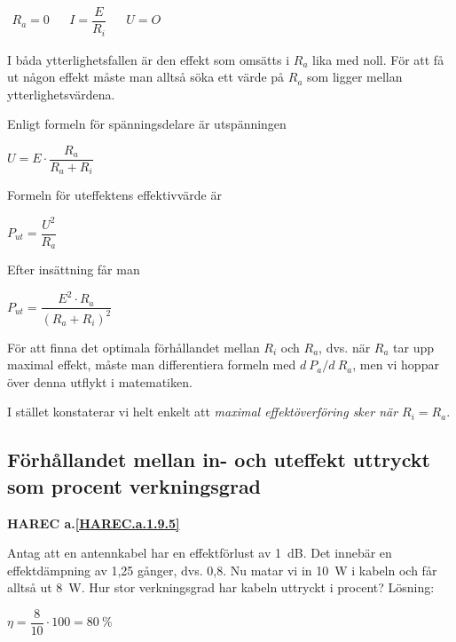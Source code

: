 \(
\begin{array}{lllll}
R_a = 0 & & I = \dfrac{E}{R_i} & & U = O
\end{array}
\)

I båda ytterlighetsfallen är den effekt som omsätts i \(R_a\) lika med noll.
För att få ut någon effekt måste man alltså söka ett värde på \(R_a\) som
ligger mellan ytterlighetsvärdena.

Enligt formeln för spänningsdelare är utspänningen

\(U = E \cdot \dfrac{R_a}{R_a+R_i}\)

Formeln för uteffektens effektivvärde är

\(P_{ut} = \dfrac{U^2}{R_a}\)

Efter insättning får man

\(P_{ut} = \dfrac{E^2 \cdot R_a}{(R_a + R_i)^2}\)

För att finna det optimala förhållandet mellan \(R_i\) och \(R_a\), dvs. när
\(R_a\) tar upp maximal effekt, måste man differentiera formeln med \(d\ P_a/d\ R_a\), men vi hoppar över denna utflykt i matematiken.

I stället konstaterar vi helt enkelt att \emph{maximal effektöverföring sker när
\(R_i = R_a\)}.

\subsection{Förhållandet mellan in- och uteffekt uttryckt som procent verkningsgrad}
\textbf{HAREC a.\ref{HAREC.a.1.9.5}\label{myHAREC.a.1.9.5}}

Antag att en antennkabel har en effektförlust av 1~dB.
Det innebär en effektdämpning av 1,25 gånger, dvs. 0,8.
Nu matar vi in 10~W i kabeln och får alltså ut 8~W.
Hur stor verkningsgrad har kabeln uttryckt i procent?
Lösning:

\(\eta = \dfrac{8}{10} \cdot 100 = 80\ \%\)

